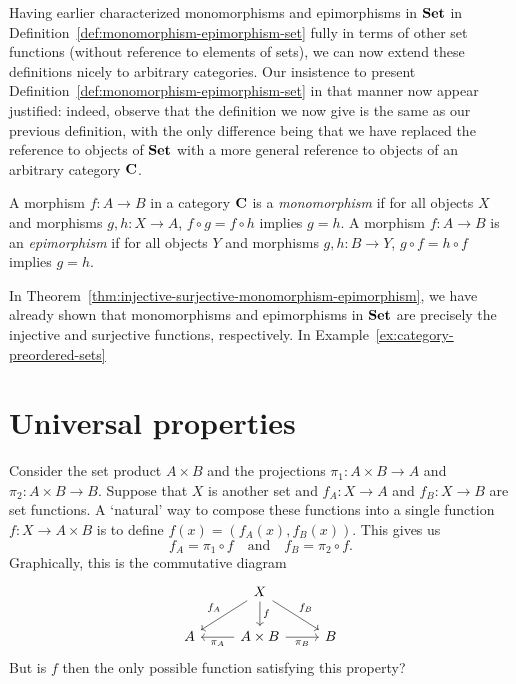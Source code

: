 Having earlier characterized monomorphisms and epimorphisms in \(\mathbf{Set}\) in
Definition~\ref{def:monomorphism-epimorphism-set} fully in terms of other set
functions (without reference to elements of sets), we can now extend these
definitions nicely to arbitrary categories. Our insistence to present
Definition~\ref{def:monomorphism-epimorphism-set} in that manner now appear
justified: indeed, observe that the definition we now give is the same as our
previous definition, with the only difference being that we have replaced the
reference to objects of \(\mathbf{Set}\) with a more general reference to objects of an
arbitrary category \(\mathbf{C}\).

\begin{definition}
    \label{def:monomorphism-epimorphism-category}
    A morphism \(f: A \to B\) in a category \(\mathbf{C}\) is a
    \emph{monomorphism} if for all objects \(X\) and morphisms \(g, h: X \to
    A\), \(f \circ g = f \circ h\) implies \(g = h\). A morphism \(f: A \to B\)
    is an \emph{epimorphism} if for all objects \(Y\) and morphisms \(g, h: B
    \to Y\), \(g \circ f = h \circ f\) implies \(g = h\).
\end{definition}

In Theorem~\ref{thm:injective-surjective-monomorphism-epimorphism}, we have
already shown that monomorphisms and epimorphisms in \(\mathbf{Set}\) are precisely the
injective and surjective functions, respectively. In
Example~\ref{ex:category-preordered-sets}


\section{Universal properties}

Consider the set product \(A \times B\) and the projections \(\pi_1: A \times B
\to A\) and \(\pi_2: A \times B \to B\). Suppose that \(X\) is another set and
\(f_A : X \to A\) and \(f_B : X \to B\) are set functions. A `natural' way to
compose these functions into a single function \(f: X \to A \times B\) is to
define \(f(x) = (f_A(x), f_B(x))\). This gives us
\[
    f_A = \pi_1 \circ f \quad \text{and} \quad f_B = \pi_2 \circ f.
\]
Graphically, this is the commutative diagram
\begin{equation}
    \label{eq:set-product-universal-property}
    \begin{tikzcd}
        & X \arrow[ld, "f_A"'] \arrow[rd, "f_B"] \arrow[d, "f"] &   \\
      A & A \times B \arrow[r, "\pi_B"'] \arrow[l, "\pi_A"]     & B
      \end{tikzcd} 
\end{equation}
But is \(f\) then the only possible function satisfying this property?

